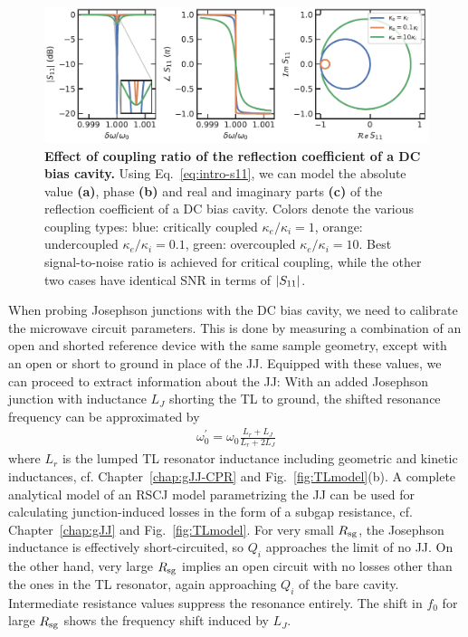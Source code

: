 \begin{figure}[t]
	\centering
	\includegraphics[width=\linewidth]{chapter-introduction/figs/model_DC_bias_cavity_coupling.pdf}
	\caption{
		\textbf{Effect of coupling ratio of the reflection coefficient of a DC bias cavity.}
		Using Eq.~\ref{eq:intro-s11}, we can model the absolute value \textbf{(a)}, phase \textbf{(b)} and real and imaginary parts \textbf{(c)} of the reflection coefficient of a DC bias cavity.
		Colors denote the various coupling types: blue: critically coupled $\kappa_e/\kappa_i=1$, orange: undercoupled $\kappa_e/\kappa_i=0.1$, green: overcoupled $\kappa_e/\kappa_i=10$.
		Best signal-to-noise ratio is achieved for critical coupling, while the other two cases have identical SNR in terms of $\lvert S_{11}\rvert$.
	}
	\label{fig:s11}
\end{figure}

When probing Josephson junctions with the DC bias cavity, we need to calibrate the microwave circuit parameters.
%
This is done by measuring a combination of an open and shorted reference device with the same sample geometry, except with an open or short to ground in place of the JJ.
%
Equipped with these values, we can proceed to extract information about the JJ:
%
With an added Josephson junction with inductance $L_J$ shorting the TL to ground, the shifted resonance frequency can be approximated by
%
\begin{align}
\omega_0^\prime = \omega_0\frac{L_r+L_J}{L_r+2L_J}
\label{eq:intro-omega0p}
\end{align}
%
where $L_r$ is the lumped TL resonator inductance including geometric and kinetic inductances, cf. Chapter~\ref{chap:gJJ-CPR} and Fig.~\ref{fig:TLmodel}(b).
%
A complete analytical model of an RSCJ model parametrizing the JJ can be used for calculating junction-induced losses in the form of a subgap resistance, cf. Chapter~\ref{chap:gJJ} and Fig.~\ref{fig:TLmodel}.
%
For very small $R_{\rm sg}$, the Josephson inductance is effectively short-circuited, so $Q_i$ approaches the limit of no JJ.
%
On the other hand, very large $R_{\rm sg}$ implies an open circuit with no losses other than the ones in the TL resonator, again approaching $Q_i$ of the bare cavity.
%
Intermediate resistance values suppress the resonance entirely.
%
The shift in $f_0$ for large $R_{\rm sg}$ shows the frequency shift induced by $L_J$.

